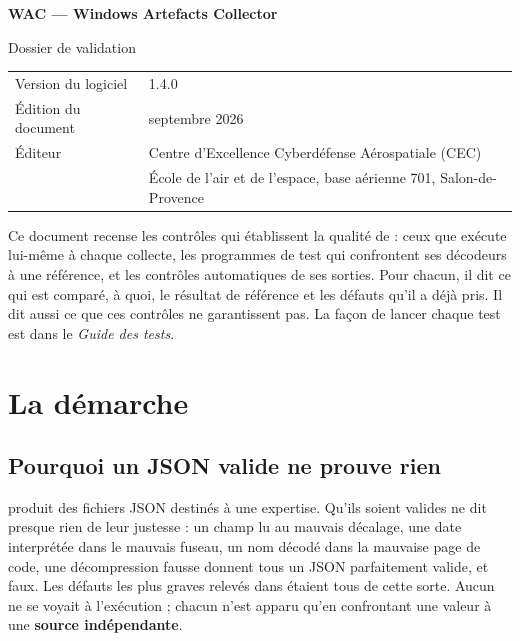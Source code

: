 \documentclass[11pt,a4paper,oneside]{report}
\begin{document}

\thispagestyle{empty}
\vspace*{\fill}
{\color{marine}\Large\bfseries WAC — Windows Artefacts Collector}\par
{\color{bleu}Dossier de validation}\par
\medskip
\begin{tabular}{@{}ll@{}}
Version du logiciel & 1.4.0 \\
Édition du document & septembre 2026 \\
Éditeur & Centre d'Excellence Cyberdéfense Aérospatiale (CEC) \\
        & École de l'air et de l'espace, base aérienne 701, Salon-de-Provence \\
\end{tabular}

\bigskip
{\small\color{gris}Ce document recense les contrôles qui établissent la
qualité de \wac{} : ceux que \wac{} exécute lui-même à chaque collecte, les
programmes de test qui confrontent ses décodeurs à une référence, et les
contrôles automatiques de ses sorties. Pour chacun, il dit ce qui est comparé,
à quoi, le résultat de référence et les défauts qu'il a déjà pris. Il dit aussi
ce que ces contrôles ne garantissent pas. La façon de lancer chaque test est
dans le \emph{Guide des tests}.}
\vspace*{2cm}
\clearpage

\tableofcontents

\chapter{La démarche}

\section{Pourquoi un JSON valide ne prouve rien}

\wac{} produit des fichiers JSON destinés à une expertise. Qu'ils soient
valides ne dit presque rien de leur justesse : un champ lu au mauvais décalage,
une date interprétée dans le mauvais fuseau, un nom décodé dans la mauvaise
page de code, une décompression fausse donnent tous un JSON parfaitement
valide, et faux. Les défauts les plus graves relevés dans \wac{} étaient tous de
cette sorte. Aucun ne se voyait à l'exécution ; chacun n'est apparu qu'en
confrontant une valeur à une \textbf{source indépendante}.
\end{document}
